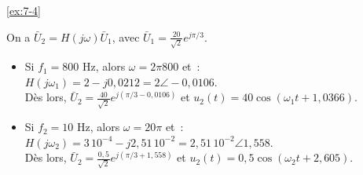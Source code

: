 \begin{solexercise}{\ref{ex:7-4}}
~

On a $\bar{U}_2 = H(j\omega) \bar{U}_1$, avec $\bar{U}_1 = \frac{20}{\sqrt{2}}e^{j\pi/3}$.
\begin{itemize}
	\item Si $f_1 = 800$ Hz, alors $\omega = 2\pi 800$ et~:\\
	$H(j\omega_1) = 2 - j0,0212 = 2\angle-0,0106$. \\
	Dès lors, $\bar{U}_2 = \frac{40}{\sqrt{2}} e^{j(\pi/3 - 0,0106)}$ et $u_2(t) = 40 \cos(\omega_1 t + 1,0366)$.
	\item Si $f_2 = 10$ Hz, alors $\omega = 20\pi$ et~:\\
	$H(j\omega_2) = 3\,10^{-4} - j2,51\,10^{-2} = 2,51\,10^{-2}\angle1,558$. \\
	Dès lors, $\bar{U}_2 = \frac{0,5}{\sqrt{2}} e^{j(\pi/3 + 1,558)}$ et $u_2(t) = 0,5 \cos(\omega_2 t + 2,605)$.
\end{itemize}

\end{solexercise}

